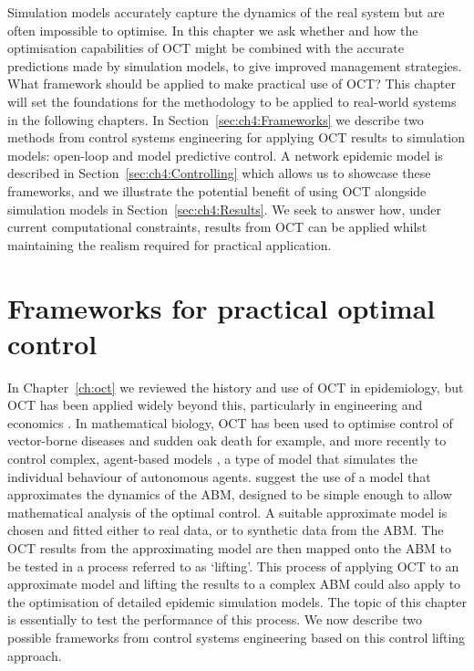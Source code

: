 \newpage
Simulation models accurately capture the dynamics of the real system but are often impossible to optimise. In this chapter we ask whether and how the optimisation capabilities of OCT might be combined with the accurate predictions made by simulation models, to give improved management strategies. What framework should be applied to make practical use of OCT? This chapter will set the foundations for the methodology to be applied to real-world systems in the following chapters. In Section~\ref{sec:ch4:Frameworks} we describe two methods from control systems engineering for applying OCT results to simulation models: open-loop and model predictive control. A network epidemic model is described in Section~\ref{sec:ch4:Controlling} which allows us to showcase these frameworks, and we illustrate the potential benefit of using OCT alongside simulation models in Section~\ref{sec:ch4:Results}. We seek to answer how, under current computational constraints, results from OCT can be applied whilst maintaining the realism required for practical application.

\section{Frameworks for practical optimal control\label{sec:ch4:Frameworks}}

In Chapter~\ref{ch:oct} we reviewed the history and use of OCT in epidemiology, but OCT has been applied widely beyond this, particularly in engineering and economics \citep{bertsekas_dynamic_2001}. In mathematical biology, OCT has been used to optimise control of vector-borne diseases \citep{blayneh_optimal_2009} and sudden oak death \citep{ndeffo_mbah_balancing_2010} for example, and more recently to control complex, agent-based models \citep[ABMs;][]{an_optimization_2017}, a type of model that simulates the individual behaviour of autonomous agents. \citet{an_optimization_2017} suggest the use of a model that approximates the dynamics of the ABM, designed to be simple enough to allow mathematical analysis of the optimal control. A suitable approximate model is chosen and fitted either to real data, or to synthetic data from the ABM\@. The OCT results from the approximating model are then mapped onto the ABM to be tested in a process referred to as `lifting'. This process of applying OCT to an approximate model and lifting the results to a complex ABM could also apply to the optimisation of detailed epidemic simulation models. The topic of this chapter is essentially to test the performance of this process. We now describe two possible frameworks from control systems engineering based on this control lifting approach.

